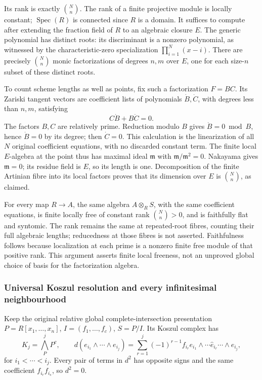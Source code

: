 Its rank is exactly \(\binom{N}{n}\). The rank of a finite projective module is locally constant; \(\operatorname{Spec}(R)\) is connected since \(R\) is a domain. It suffices to compute after extending the fraction field of \(R\) to an algebraic closure \(E\). The generic polynomial has distinct roots: its discriminant is a nonzero polynomial, as witnessed by the characteristic-zero specialization \(\prod_{i=1}^N(x-i)\). There are precisely \(\binom Nn\) monic factorizations of degrees \(n,m\) over \(E\), one for each size-\(n\) subset of these distinct roots.

To count scheme lengths as well as points, fix such a factorization \(F=BC\). Its Zariski tangent vectors are coefficient lists of polynomials \(\dot B,\dot C\), with degrees less than \(n,m\), satisfying \[
C\dot B+B\dot C=0.
\] The factors \(B,C\) are relatively prime. Reduction modulo \(B\) gives \(\dot B=0\bmod B\), hence \(\dot B=0\) by its degree; then \(\dot C=0\). This calculation is the linearization of all \(N\) original coefficient equations, with no discarded constant term. The finite local \(E\)-algebra at the point thus has maximal ideal \(\mathfrak m\) with \(\mathfrak m/\mathfrak m^2=0\). Nakayama gives \(\mathfrak m=0\); its residue field is \(E\), so its length is one. Decomposition of the finite Artinian fibre into its local factors proves that its dimension over \(E\) is \(\binom Nn\), as claimed.

For every map \(R\to A\), the same algebra \(A\otimes_R S\), with the same coefficient equations, is finite locally free of constant rank \(\binom Nn>0\), and is faithfully flat and syntomic. The rank remains the same at repeated-root fibres, counting their full algebraic lengths; reducedness at those fibres is not asserted. Faithfulness follows because localization at each prime is a nonzero finite free module of that positive rank. This argument asserts finite local freeness, not an unproved global choice of basis for the factorization algebra.

\subsubsection{Universal Koszul resolution and every infinitesimal neighbourhood}\label{algebra-proof-046-universal-koszul-resolution-and-every-infinitesimal-neighbourhood}

Keep the original relative global complete-intersection presentation \(P=R[x_1,\ldots,x_n]\), \(I=(f_1,\ldots,f_c)\), \(S=P/I\). Its Koszul complex has \[
K_j=\bigwedge^j_P P^c,\qquad
d(e_{i_1}\wedge\cdots\wedge e_{i_j})
=\sum_{r=1}^j(-1)^{r-1}f_{i_r}
 e_{i_1}\wedge\cdots\widehat e_{i_r}\cdots\wedge e_{i_j},
\] for \(i_1<\cdots<i_j\). Every pair of terms in \(d^2\) has opposite signs and the same coefficient \(f_{i_r}f_{i_s}\), so \(d^2=0\).

